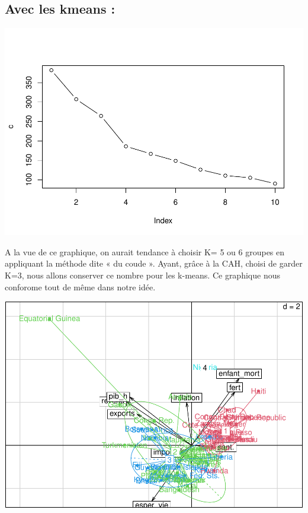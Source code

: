 \documentclass[
]{article}
\newenvironment{Shaded}{}{}
\newcommand{\AttributeTok}[1]{#1}
\newcommand{\DecValTok}[1]{#1}
\newcommand{\FunctionTok}[1]{#1}
\newcommand{\NormalTok}[1]{#1}
\newcommand{\OtherTok}[1]{\textcolor[rgb]{1.00,0.25,0.00}{#1}}
\newcommand{\SpecialCharTok}[1]{\textcolor[rgb]{0.00,0.50,0.50}{#1}}
\begin{document}
\hypertarget{avec-les-kmeans}{%
\subsection{Avec les kmeans :}\label{avec-les-kmeans}}

\includegraphics{Projet_files/figure-latex/unnamed-chunk-36-1.pdf}

A la vue de ce graphique, on aurait tendance à choisir K= 5 ou 6 groupes
en appliquant la méthode dite « du coude ». Ayant, grâce à la CAH,
choisi de garder K=3, nous allons conserver ce nombre pour les k-means.
Ce graphique nous conforome tout de même dans notre idée.

\begin{Shaded}
\end{Shaded}

\includegraphics{Projet_files/figure-latex/unnamed-chunk-37-1.pdf}
\end{document}
